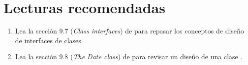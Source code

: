 \section{Lecturas recomendadas}

\begin{enumerate}

\item Lea la sección 9.7 (\emph{Class interfaces}) 
      de \pppbook{}
      para repasar los conceptos de diseño de interfaces de clases.

\item Lea la sección 9.8 (\emph{The Date class})
      de \pppbook{}
      para revisar un diseño de una clase .

\end{enumerate}
